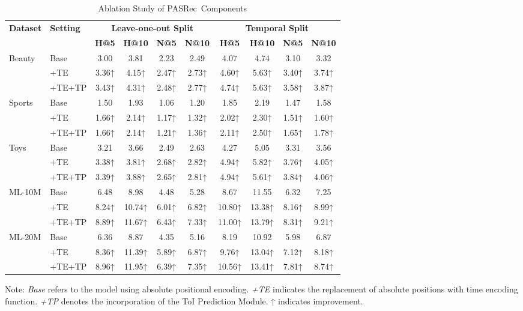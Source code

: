 \documentclass[sigconf,nonacm]{acmart}
\newcommand{\modelname}{PASRec}
\begin{document}
\begin{table}[htbp]
\centering
\caption{Ablation Study of \modelname\ Components}
\label{tab:combined_ablation}
\begin{adjustbox}{max width=\columnwidth}
\begin{tabular}{llcccccccc}
\toprule
\multirow{2}{*}{\textbf{Dataset}} & \multirow{2}{*}{\textbf{Setting}} & \multicolumn{4}{c}{\textbf{Leave-one-out Split}} & \multicolumn{4}{c}{\textbf{Temporal Split}} \\
\cmidrule(lr){3-6} \cmidrule(lr){7-10}
& & \textbf{H@5} & \textbf{H@10} & \textbf{N@5} & \textbf{N@10} & \textbf{H@5} & \textbf{H@10} & \textbf{N@5} & \textbf{N@10} \\
\midrule
\multirow{3}{*}{Beauty}
 & Base         & 3.00   & 3.81      & 2.23   & 2.49   & 4.07   & 4.74   & 3.10   & 3.32 \\
 & +TE          & 3.36↑  & 4.15↑     & 2.47↑  & 2.73↑  & 4.60↑  & 5.63↑  & 3.40↑  & 3.74↑ \\
 & +TE+TP       & 3.43↑  & 4.31↑     & 2.48↑  & 2.77↑  & 4.74↑  & 5.63↑  & 3.58↑  & 3.87↑ \\
\midrule
\multirow{3}{*}{Sports}
 & Base         & 1.50   & 1.93   & 1.06   & 1.20   & 1.85   & 2.19   & 1.47   & 1.58 \\
 & +TE          & 1.66↑  & 2.14↑  & 1.17↑  & 1.32↑  & 2.02↑  & 2.30↑  & 1.51↑  & 1.60↑ \\ 
 & +TE+TP       & 1.66↑  & 2.14↑  & 1.21↑  & 1.36↑  & 2.11↑  & 2.50↑  & 1.65↑  & 1.78↑ \\
\midrule
\multirow{3}{*}{Toys}
 & Base         & 3.21   & 3.66   & 2.49   & 2.63   & 4.27   & 5.05   & 3.31   & 3.56 \\
 & +TE          & 3.38↑  & 3.81↑  & 2.68↑  & 2.82↑  & 4.94↑  & 5.82↑  & 3.76↑  & 4.05↑ \\
 & +TE+TP       & 3.39↑  & 3.88↑  & 2.65↑  & 2.81↑  & 4.94↑  & 5.61↑  & 3.84↑  & 4.06↑ \\
\midrule
\multirow{3}{*}{ML-10M}
 & Base         & 6.48   & 8.98    & 4.48   & 5.28   & 8.67   & 11.55   & 6.32   & 7.25 \\
 & +TE          & 8.24↑  & 10.74↑  & 6.01↑  & 6.82↑  & 10.80↑ & 13.38↑  & 8.16↑  & 8.99↑ \\
 & +TE+TP       & 8.89↑  & 11.67↑  & 6.43↑  & 7.33↑  & 11.00↑ & 13.79↑  & 8.31↑  & 9.21↑ \\
\midrule
\multirow{3}{*}{ML-20M}
 & Base         & 6.36   & 8.87    & 4.35   & 5.16   & 8.19    & 10.92   & 5.98   & 6.87 \\
 & +TE          & 8.36↑  & 11.39↑  & 5.89↑  & 6.87↑  & 9.76↑   & 13.04↑  & 7.12↑  & 8.18↑ \\
 & +TE+TP       & 8.96↑  & 11.95↑  & 6.39↑  & 7.35↑  & 10.56↑  & 13.41↑  & 7.81↑  & 8.74↑ \\
\bottomrule
\end{tabular}
\end{adjustbox}
\footnotesize{Note: \textit{Base} refers to the model using absolute positional encoding. \textit{+TE} indicates the replacement of absolute positions with time encoding function. \textit{+TP} denotes the incorporation of the ToI Prediction Module. ↑ indicates improvement.}
\end{table}
\end{document}
